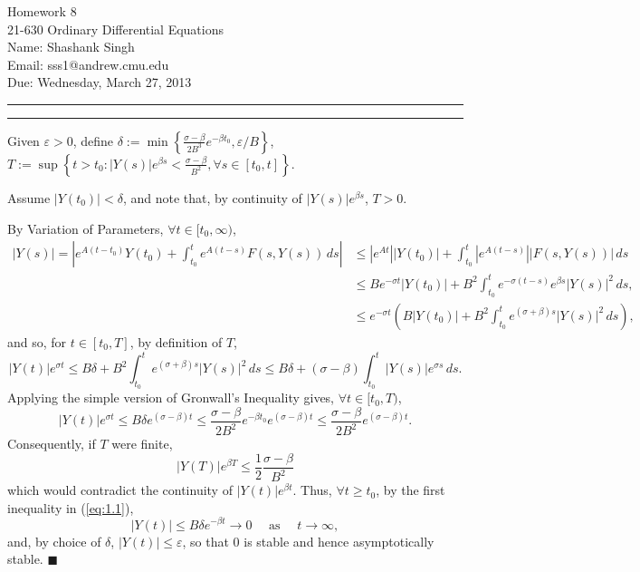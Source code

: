 \documentclass[11pt]{article}
\makeatletter
\newcounter{questionCounter}
\newcounter{partCounter}[questionCounter]
\newenvironment{question}[2][\arabic{questionCounter}]{%
    \setcounter{partCounter}{0}%
    \vspace{.25in} \hrule \vspace{0.5em}%
        \noindent{\bf #2}%
    \vspace{0.8em} \hrule \vspace{.10in}%
    \addtocounter{questionCounter}{1}%
}{}
\newcommand{\myname}{Shashank Singh}
\newcommand{\myandrew}{sss1@andrew.cmu.edu}
\newcommand{\myclass}{21-630 Ordinary Differential Equations}
\newcommand{\myhwnum}{8}
\newcommand{\duedate}{Wednesday, March 27, 2013}
\renewcommand{\qed}{\quad $\blacksquare$}
\newcommand{\e}{\varepsilon} %
\makeatother
\begin{document}
\thispagestyle{plain}

{\Large Homework \myhwnum} \\
\myclass \\
Name: \myname \\
Email: \myandrew \\
Due: \duedate

\begin{question}{Problem 1}
Given $\e > 0$, define
$\displaystyle \delta := \min\left\{
                                \frac{\sigma - \beta}{2B^3}e^{-\beta t_0},
                                \e/B
                            \right\}$,
$\displaystyle T
    := \sup \left\{ t > t_0 : |Y(s)| e^{\beta s} < \frac{\sigma - \beta}{B^2},
                                            \forall s \in [t_0,t] \right\}.$

Assume $|Y(t_0)| < \delta$, and note that, by continuity of $|Y(s)| e^{\beta s}$,
$T > 0$.

By Variation of Parameters, $\forall t \in [t_0,\infty)$,
\begin{align*}
|Y(s)|
    = \left| e^{A(t - t_0)} Y(t_0)
    + \int_{t_0}^t e^{A(t - s)} F(s,Y(s)) \, ds \right|
 &  \leq \left| e^{At} \right| |Y(t_0)|
    + \int_{t_0}^t \left| e^{A(t - s)} \right| |F(s,Y(s))| \, ds        \\
 &  \leq B e^{-\sigma t} |Y(t_0)|
    + B^2 \int_{t_0}^t e^{-\sigma(t - s)} e^{\beta s} |Y(s)|^2 \, ds,   \\
 &  \leq e^{-\sigma t} \left( B |Y(t_0)|
    + B^2 \int_{t_0}^t e^{(\sigma + \beta) s} |Y(s)|^2 \, ds \right),
\end{align*}
and so, for $t \in [t_0,T]$, by definition of $T$,
\[|Y(t)| e^{\sigma t}
    \leq B \delta
    + B^2 \int_{t_0}^t e^{(\sigma + \beta) s} |Y(s)|^2 \, ds
    \leq B \delta 
    + (\sigma - \beta) \int_{t_0}^t |Y(s)| e^{\sigma s} \, ds.
\]
Applying the simple version of Gronwall's Inequality gives,
$\forall t \in [t_0,T)$,
\begin{equation}
|Y(t)| e^{\sigma t}
    \leq B\delta e^{(\sigma - \beta) t}
    \leq \frac{\sigma - \beta}{2B^2} e^{-\beta t_0} e^{(\sigma - \beta) t}
    \leq \frac{\sigma - \beta}{2B^2} e^{(\sigma - \beta) t}.
\label{eq:1.1}
\end{equation}
Consequently, if $T$ were finite,
\[
|Y(T)| e^{\beta T}
    \leq \frac12 \frac{\sigma - \beta}{B^2}
\]
which would contradict the continuity of $|Y(t)| e^{\beta t}$. Thus,
$\forall t \geq t_0$, by the first inequality in (\ref{eq:1.1}),
\[
|Y(t)|
    \leq B\delta e^{-\beta t}
    \rightarrow 0
    \quad \mbox{ as } \quad t \rightarrow \infty,
\]
and, by choice of $\delta$, $|Y(t)| \leq \e$, so that $0$ is
stable and hence asymptotically stable. \qed
\end{question}
\end{document}
